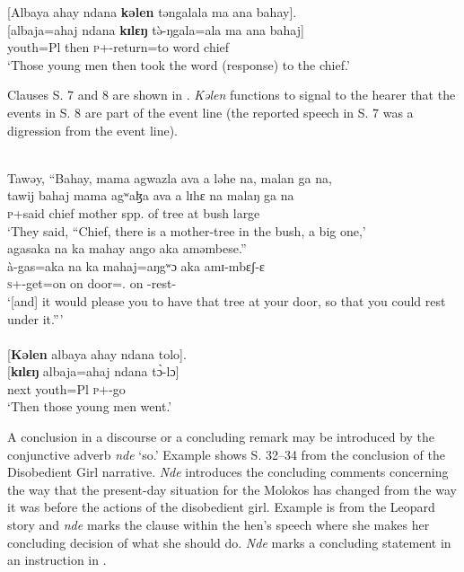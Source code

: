\medskip
{}[Albaya  ahay  ndana \textbf{kəlen} təngalala  ma  ana  bahay].\\
\gll {}[albaja=ahaj ndana \textbf{kɪlɛŋ} t\`{ə}-ŋgala=ala ma ana bahaj]\\
     youth=Pl       {\DEM}  then  \textsc{p}+{\PFV}-return=to    word    {\DAT}   chief\\
\glt  ‘Those young men then took the word (response) to the chief.’  
\z 

Clauses S. 7 and 8 are shown in . \textit{Kəlen} functions to signal to the hearer that the events in S. 8 are part of the event line (the reported speech in S. 7 was a digression from the event line).

\ea \label{ex:12:57}
\\
Tawəy, “Bahay, mama agwazla ava a ləhe na, malan ga na,\\  
\gll  tawij  bahaj mama agʷaɮa ava a lɪhɛ na malaŋ ga na\\ 
      \textsc{p}+said  chief mother {spp. of tree} {\EXT} at bush {\PSP} large {\ADJ} {\PSP}\\ 
\glt ‘They said, “Chief, there is a mother-tree in the bush,  a big one,’\\

\medskip
agasaka na ka mahay ango aka aməmbese.”\\
\gll à-gas=aka na ka mahaj=aŋgʷɔ aka amɪ-mbɛʃ-ɛ\\ 
     \textsc{s}+{\PFV}-get=on  {\PSP}  on door={\twoS}.{\POSS} on {\DEP}-rest{}-{\CL}\\
\glt  ‘[and] it would please you to have that tree at your door, so that you could rest under it.”’\\

\medskip
{}\\
{}[\textbf{Kəlen} albaya ahay ndana  tolo].\\
\gll  {}[\textbf{kɪlɛŋ} albaja=ahaj ndana t\`{ɔ}-lɔ]\\
      next    youth=Pl  {\DEM}  \textsc{p}+{\PFV}-go\\
\glt  ‘Then those young men went.’ 
\z 

A conclusion in a discourse or a concluding remark may be introduced by the conjunctive adverb \textit{nde} ‘so.’ Example  shows S. 32--34 from the conclusion of the Disobedient Girl narrative.  \textit{Nde} introduces the concluding comments concerning the way that the present-day situation for the Molokos has changed from the way it was before the actions of the disobedient girl. Example  is from the Leopard story \citep{Friesen2003} and \textit{nde} marks the clause within the hen’s speech where she makes her concluding decision of what she should do. \textit{Nde} marks a concluding statement in an instruction in . 

